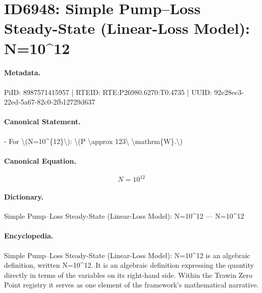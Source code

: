 \section*{ID6948: Simple Pump–Loss Steady-State (Linear-Loss Model): N=10\textasciicircum{}12}
\paragraph{Metadata.}
PiID: 8987571415957 | RTEID: RTE:P26980.6270:T0.4735 | UUID: 92e28ec3-22ed-5a67-82c0-2fb12729d637

\paragraph{Canonical Statement.}
- For \textbackslash{}(N=10\textasciicircum{}\{12\}\textbackslash{}): \textbackslash{}(P \textbackslash{}approx 123\textbackslash{} \textbackslash{}mathrm\{W\}.\textbackslash{})

\paragraph{Canonical Equation.}
\[
N=10^{12}
\]

\paragraph{Dictionary.}
Simple Pump–Loss Steady-State (Linear-Loss Model): N=10\textasciicircum{}12 — N=10\textasciicircum{}12

\paragraph{Encyclopedia.}
Simple Pump–Loss Steady-State (Linear-Loss Model): N=10\textasciicircum{}12 is an algebraic definition, written N=10\textasciicircum{}12. It is an algebraic definition expressing the quantity directly in terms of the variables on its right-hand side. Within the Trawin Zero Point registry it serves as one element of the framework's mathematical narrative.
